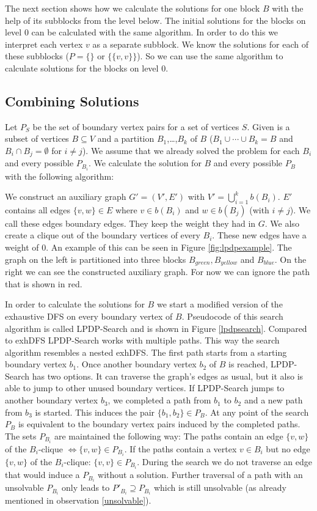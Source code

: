 \documentclass[11pt]{article}
\begin{document}
The next section shows how we calculate the solutions for one block $B$ with the help of its subblocks from the level below. The initial solutions for the blocks on level 0 can be calculated with the same algorithm. In order to do this we interpret each vertex $v$ as a separate subblock. We know the solutions for each of these subblocks ($P= \{\}$ or $\{\{v,v\}\}$). So we can use the same algorithm to calculate solutions for the blocks on level 0.

\subsection{Combining Solutions}
\label{sec:combsolutions}
Let $P_S$ be the set of boundary vertex pairs for a set of vertices $S$. Given is a subset of vertices $B \subseteq V$ and a partition $B_1$,\ldots,$B_k$ of $B$ ($B_1\cup\cdots\cup B_k=B$ and $B_i\cap B_j=\emptyset$ for $i\neq j$). We assume that we already solved the problem for each $B_i$ and every possible $P_{B_i}$. We calculate the solution for $B$ and every possible $P_B$ with the following algorithm:

We construct an auxiliary graph $G' = (V', E')$ with $V' = \bigcup\limits_{i=1}^{k} b(B_{i})$. $E'$ contains all edges $\{v,w\} \in E$ where $v \in b(B_i)$ and $w \in b(B_j)$ (with $i \neq j$). We call these edges boundary edges. They keep the weight they had in $G$. We also create a clique out of the boundary vertices of every $B_i$. These new edges have a weight of 0. An example of this can be seen in Figure \ref{fig:lpdpexample}. The graph on the left is partitioned into three blocks $B_{green},  B_{yellow}$ and $B_{blue}$. On the right we can see the constructed auxiliary graph. For now we can ignore the path that is shown in red.

In order to calculate the solutions for $B$ we start a modified version of the exhaustive DFS on every boundary vertex of $B$. Pseudocode of this search algorithm is called LPDP-Search and is shown in Figure \ref{lpdpsearch}. Compared to exhDFS LPDP-Search works with multiple paths. This way the search algorithm resembles a nested exhDFS. The first path starts from a starting boundary vertex $b_1$. Once another boundary vertex $b_2$ of $B$ is reached, LPDP-Search has two options. It can traverse the graph's edges as usual, but it also is able to jump to other unused boundary vertices. If LPDP-Search jumps to another boundary vertex $b_3$, we completed a path from $b_1$ to $b_2$ and a new path from $b_3$ is started. This induces the pair $\{b_1,b_2\} \in P_B$. At any point of the search $P_B$ is equivalent to the boundary vertex pairs induced by the completed paths. The sets $P_{B_i}$ are maintained the following way: The paths contain an edge $\{v,w\}$ of the $B_i$-clique $\iff \{v,w\} \in P_{B_i}$. If the paths contain a vertex $v \in B_i$ but no edge $\{v,w\}$ of the $B_i$-clique: $\{v,v\} \in P_{B_i}$. During the search we do not traverse an edge that would induce a $P_{B_i}$ without a solution. Further traversal of a path with an unsolvable $P_{B_i}$ only leads to $P'_{B_i} \supseteq P_{B_i}$ which is still unsolvable (as already mentioned in observation \ref{unsolvable}).
\end{document}
